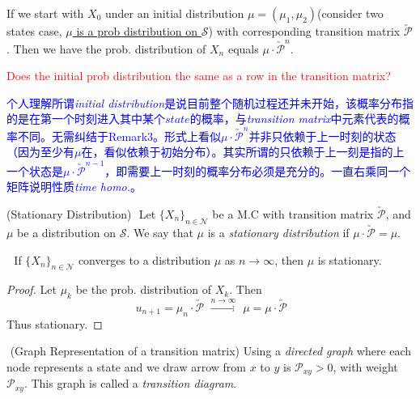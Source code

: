 \documentclass[10.5pt]{article}
\newcommand*\circled[1]{\tikz[baseline=(char.base)]{
            \node[shape=circle,draw,inner sep=2pt] (char) {#1};}}
\newcommand{\transmtx}[0]{\utilde{\mathcal{P}}}
\newcommand{\srv}[0]{\{X_n\}_{n \in \mathcal{N}}}
\newenvironment{changemargin}[2]{%
  \begin{list}{}{%
    \setlength{\topsep}{0pt}%
    \setlength{\leftmargin}{#1}%
    \setlength{\rightmargin}{#2}%
    \setlength{\listparindent}{\parindent}%
    \setlength{\itemindent}{\parindent}%
    \setlength{\parsep}{\parskip}%
  }%
  \item[]}{\end{list}}
\begin{document}
\begin{changemargin}{-0.125in}{0in}
\begin{enumerate}
\begin{enumerate}
     \medskip
     
     \begin{remark}
     	If we start with $X_0$ under an initial distribution $\mu = (\mu_1, \mu_2)$(consider two states case, \underline{$\mu$ is a prob distribution on $\mathcal{S}$}) with corresponding transition matrix $\utilde{\mathcal{P}}$. Then we have the prob. distribution of $X_n$ equals $\mu\cdot\transmtx^n$.
     \end{remark}
     
     \medskip
     
     \textcolor{red}{Does the initial prob distribution the same as a row in the transition matrix?} 
     
     \smallskip
     
     \medskip
     
     \textcolor{blue}{个人理解\circled{1}所谓\textit{initial distribution}是说目前整个随机过程还并未开始，该概率分布指的是在第一个时刻进入其中某个$state$的概率，与\textit{transition matrix}中元素代表的概率不同。\circled{2}无需纠结于Remark3。形式上看似$\mu \cdot \transmtx^n$并非只依赖于上一时刻的状态（因为至少有$\mu$在，看似依赖于初始分布）。其实所谓的只依赖于上一刻是指的上一个状态是$\mu \cdot \transmtx^{n-1}$，即需要上一时刻的概率分布必须是充分的。一直右乘同一个矩阵说明性质\textit{time homo.}。}
     
     \medskip
     
     \begin{definition}(Stationary Distribution) \,\,Let $\{X_n\}_{n \in \mathcal{N}}$ be a M.C with transition matrix $\transmtx$, and $\mu$ be a distribution on $\mathcal{S}$. We say that $\mu$ is a \textit{stationary distribution} if $\mu \cdot \transmtx = \mu$.
     \end{definition}

     \medskip
     
     \begin{proposition}\,\, If $\srv$ converges to a distribution $\mu$ as $n \rightarrow \infty$, then $\mu$ is stationary.
        \begin{proof}
        	Let $\mu_k$ be the prob. distribution of $X_k$. Then 
        	\[
        	\,u_{n+1} = \mu_n \cdot \transmtx \,\, \overset{n \rightarrow \infty}{\longrightarrow}\,\, \mu = \mu \cdot \transmtx
        	\]
        	Thus stationary.
        \end{proof} 
     \end{proposition}
       
    
       \begin{definition}\,\,(Graph Representation of a transition matrix) Using a \textit{directed graph} where each node represents a state and we draw arrow from $x$ to $y$ is $\mathcal{P}_{xy} > 0$, with weight $\mathcal{P}_{xy}$. This graph is called a \textit{transition diagram}.
       \end{definition}
       

\end{enumerate}
\end{enumerate}
\end{changemargin}
\end{document}
